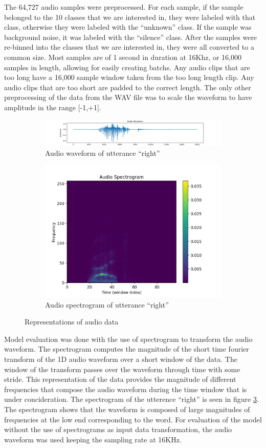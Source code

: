 \documentclass{article}
\begin{document}
The 64,727 audio samples were preprocessed. For each sample, if the
sample belonged to the 10 classes that we are interested in, they were
labeled with that class, otherwise they were labeled with the
``unknown'' class. If the sample was background noise, it was labeled
with the ``silence'' class. After the samples were re-binned into the
classes that we are interested in, they were all converted to a common
size. Most samples are of 1 second in duration at 16Khz, or 16,000
samples in length, allowing for easily creating batchs. Any audio clips
that are too long have a 16,000 sample window taken from the too long
length clip. Any audio clips that are too short are padded to the correct
length. The only other preprocessing of the data from the WAV file was
to scale the waveform to have amplitude in the range [-1,+1].
\begin{figure}
  \begin{subfigure}{.5\linewidth}
    \includegraphics[width=\linewidth]{images/waveform-right}
    \caption{Audio waveform of utterance ``right''}
    \label{fig:wave_right}
  \end{subfigure}%
  \begin{subfigure}{.5\linewidth}
    \includegraphics[width=0.75\linewidth]{images/spectrogram-right}
    \caption{Audio spectrogram of utterance ``right''}
    \label{fig:spec_right}
  \end{subfigure}
  \caption{Representations of audio data}
\end{figure}
Model evaluation was done with the use of spectrogram to
transform the audio waveform. The spectrogram computes the magnitude
of the short time fourier transform of the 1D audio waveform over a
short window of the data. The window of the transform passes over the
waveform through time with some stride. This representation of the
data provides the magnitude of different frequencies that compose the
audio waveform during the time window that is under concideration. The
spectrogram of the utterence ``right'' is seen in figure
\ref{fig:spec_right}. The spectrogram shows that the waveform is
composed of large magnitudes of frequencies at the low end
corresponding to the word. For evaluation of the model without the use
of spectrograms as input data transformation, the audio waveform was
used keeping the sampling rate at 16KHz.
\end{document}
